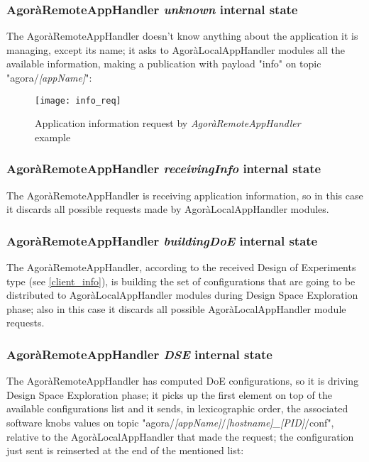 \subsubsection{AgoràRemoteAppHandler \textit{unknown} internal state}\label{req_info}

The AgoràRemoteAppHandler doesn't know anything about the application it is managing, except its name; it asks to AgoràLocalAppHandler modules all the available information, making a publication with payload "info" on topic "agora/\textit{[appName]}":

\begin{figure}[H]

    \centering
    \texttt{[image: info\_req]}
    \caption{Application information request by \textit{AgoràRemoteAppHandler} example}
    
\end{figure}


\subsubsection{AgoràRemoteAppHandler \textit{receivingInfo} internal state}

The AgoràRemoteAppHandler is receiving application information, so in this case it discards all possible requests made by AgoràLocalAppHandler modules.


\subsubsection{AgoràRemoteAppHandler \textit{buildingDoE} internal state}

The AgoràRemoteAppHandler, according to the received Design of Experiments type (see \ref{client_info}), is building the set of configurations that are going to be distributed to AgoràLocalAppHandler modules during Design Space Exploration phase; also in this case it discards all possible AgoràLocalAppHandler module requests.


\subsubsection{AgoràRemoteAppHandler \textit{DSE} internal state}\label{dse_conf}

The AgoràRemoteAppHandler has computed DoE configurations, so it is driving Design Space Exploration phase; it picks up the first element on top of the available configurations list and it sends, in lexicographic order, the associated software knobs values on topic "agora\slash{}\textit{[appName]}\slash{}\textit{[hostname]\_[PID]}\slash{}conf", relative to the AgoràLocalAppHandler that made the request; the configuration just sent is reinserted at the end of the mentioned list:

